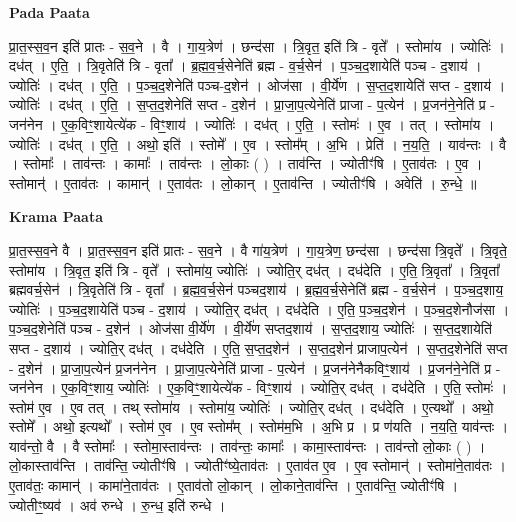 \documentclass[17pt]{extarticle}
\begin{document}
\textbf{Pada Paata} \newline

प्रा॒त॒स्स॒व॒न इति॑ प्रातः - स॒व॒ने । वै । गा॒य॒त्रेण॑ । छन्द॑सा । त्रि॒वृत॒ इति॑ त्रि - वृते᳚ । स्तोमा॑य । ज्योतिः॑ । दध॑त् । ए॒ति॒ । त्रि॒वृतेति॑ त्रि - वृता᳚ । ब्र॒ह्म॒व॒र्च॒सेनेति॑ ब्रह्म - व॒र्च॒सेन॑ । प॒ञ्च॒द॒शायेति॑ पञ्च - द॒शाय॑ । ज्योतिः॑ । दध॑त् । ए॒ति॒ । प॒ञ्च॒द॒शेनेति॑ पञ्च-द॒शेन॑ । ओज॑सा । वी॒र्ये॑ण । स॒प्त॒द॒शायेति॑ सप्त - द॒शाय॑ । ज्योतिः॑ । दध॑त् । ए॒ति॒ । स॒प्त॒द॒शेनेति॑ सप्त - द॒शेन॑ । प्रा॒जा॒प॒त्येनेति॑ प्राजा - प॒त्येन॑ । प्र॒जन॑ने॒नेति॑ प्र - जन॑नेन । ए॒क॒विꣳ॒॒शायेत्ये॑क - विꣳ॒॒शाय॑ । ज्योतिः॑ । दध॑त् । ए॒ति॒ । स्तोमः॑ । ए॒व । तत् । स्तोमा॑य । ज्योतिः॑ । दध॑त् । ए॒ति॒ । अथो॒ इति॑ । स्तोमे᳚ । ए॒व । स्तोम᳚म् । अ॒भि । प्रेति॑ । न॒य॒ति॒ । याव॑न्तः । वै । स्तोमाः᳚ । ताव॑न्तः । कामाः᳚ । ताव॑न्तः । लो॒काः ( ) । ताव॑न्ति । ज्योतीꣳ॑षि । ए॒ताव॑तः । ए॒व । स्तोमान्॑ । ए॒ताव॑तः । कामान्॑ । ए॒ताव॑तः । लो॒कान् । ए॒ताव॑न्ति । ज्योतीꣳ॑षि । अवेति॑ । रु॒न्धे॒ ॥  \newline


\textbf{Krama Paata} \newline

प्रा॒त॒स्स॒व॒ने वै । प्रा॒त॒स्स॒व॒न इति॑ प्रातः - स॒व॒ने । वै गा॑य॒त्रेण॑ । गा॒य॒त्रेण॒ छन्द॑सा । छन्द॑सा त्रि॒वृते᳚ । त्रि॒वृते॒ स्तोमा॑य । त्रि॒वृत॒ इति॑ त्रि - वृते᳚ । स्तोमा॑य॒ ज्योतिः॑ । ज्योति॒र् दध॑त् । दध॑देति । ए॒ति॒ त्रि॒वृता᳚ । त्रि॒वृता᳚ ब्रह्मवर्च॒सेन॑ । त्रि॒वृतेति॑ त्रि - वृता᳚ । ब्र॒ह्म॒व॒र्च॒सेन॑ पञ्चद॒शाय॑ । ब्र॒ह्म॒व॒र्च॒सेनेति॑ ब्रह्म - व॒र्च॒सेन॑ । प॒ञ्च॒द॒शाय॒ ज्योतिः॑ । प॒ञ्च॒द॒शायेति॑ पञ्च - द॒शाय॑ । ज्योति॒र् दध॑त् । दध॑देति । ए॒ति॒ प॒ञ्च॒द॒शेन॑ । प॒ञ्च॒द॒शेनौज॑सा । प॒ञ्च॒द॒शेनेति॑ पञ्च - द॒शेन॑ । ओज॑सा वी॒र्ये॑ण । वी॒र्ये॑ण सप्तद॒शाय॑ । स॒प्त॒द॒शाय॒ ज्योतिः॑ । स॒प्त॒द॒शायेति॑ सप्त - द॒शाय॑ । ज्योति॒र् दध॑त् । दध॑देति । ए॒ति॒ स॒प्त॒द॒शेन॑ । स॒प्त॒द॒शेन॑ प्राजाप॒त्येन॑ । स॒प्त॒द॒शेनेति॑ सप्त - द॒शेन॑ । प्रा॒जा॒प॒त्येन॑ प्र॒जन॑नेन । प्रा॒जा॒प॒त्येनेति॑ प्राजा - प॒त्येन॑ । प्र॒जन॑नेनैकविꣳ॒॒शाय॑ । प्र॒जन॑ने॒नेति॑ प्र - जन॑नेन । ए॒क॒विꣳ॒॒शाय॒ ज्योतिः॑ । ए॒क॒विꣳ॒॒शायेत्ये॑क - विꣳ॒॒शाय॑ । ज्योति॒र् दध॑त् । दध॑देति । ए॒ति॒ स्तोमः॑ । स्तोम॑ ए॒व । ए॒व तत् । तथ् स्तोमा॑य । स्तोमा॑य॒ ज्योतिः॑ । ज्योति॒र् दध॑त् । दध॑देति । ए॒त्यथो᳚ । अथो॒ स्तोमे᳚ । अथो॒ इत्यथो᳚ । स्तोम॑ ए॒व । ए॒व स्तोम᳚म् । स्तोम॑म॒भि । अ॒भि प्र । 
प्र ण॑यति । न॒य॒ति॒ याव॑न्तः । याव॑न्तो॒ वै । वै स्तोमाः᳚ । स्तोमा॒स्ताव॑न्तः । ताव॑न्तः॒ कामाः᳚ । कामा॒स्ताव॑न्तः । ताव॑न्तो लो॒काः ( ) । लो॒कास्ताव॑न्ति । ताव॑न्ति॒ ज्योतीꣳ॑षि । ज्योतीꣳ॑ष्ये॒ताव॑तः । ए॒ताव॑त ए॒व । ए॒व स्तोमान्॑ । स्तोमा॑ने॒ताव॑तः । ए॒ताव॑तः॒ कामान्॑ । कामा॑ने॒ताव॑तः । ए॒ताव॑तो लो॒कान् । लो॒काने॒ताव॑न्ति । ए॒ताव॑न्ति॒ ज्योतीꣳ॑षि । ज्योतीꣳ॒॒ष्यव॑ । अव॑ रुन्धे । रु॒न्ध॒ इति॑ रुन्धे । \newline
\end{document}

